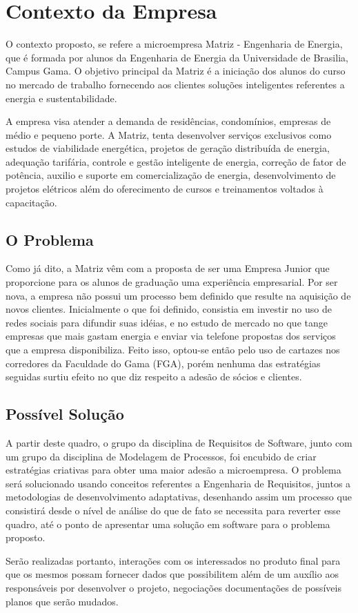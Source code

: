 \chapter[Contexto da Empresa]{Contexto da Empresa}
O contexto proposto, se refere a microempresa Matriz - Engenharia de Energia, que é formada por alunos da Engenharia de Energia da Universidade de Brasilia, Campus Gama. O objetivo principal da Matriz é a iniciação dos alunos do curso no mercado de trabalho fornecendo aos clientes soluções inteligentes referentes a energia e sustentabilidade.

A empresa visa atender a demanda de residências, condomínios, empresas de médio e pequeno porte. A Matriz, tenta desenvolver serviços exclusivos como estudos de viabilidade energética, projetos de geração distribuída de energia, adequação tarifária, controle e gestão inteligente de energia, correção de fator de potência, auxilio e suporte em comercialização de energia, desenvolvimento de projetos elétricos além do oferecimento de cursos e treinamentos voltados à capacitação.

\section{O Problema}
Como já dito, a Matriz vêm com a proposta de ser uma Empresa Junior que proporcione para os alunos de graduação uma experiência empresarial. Por ser nova, a empresa não possui um processo bem definido que resulte na aquisição de novos clientes. Inicialmente o que foi definido, consistia em investir no uso de redes sociais para difundir suas idéias, e no estudo de mercado no que tange empresas que mais gastam energia e enviar via telefone propostas dos serviços que a empresa disponibiliza. Feito isso, optou-se então pelo uso de cartazes nos corredores da Faculdade do Gama (FGA), porém nenhuma das estratégias seguidas surtiu efeito no que diz respeito a adesão de sócios e clientes.

\section{Possível Solução}
A partir deste quadro, o grupo da disciplina de Requisitos de Software, junto com um grupo da disciplina de Modelagem de Processos, foi encubido de criar estratégias criativas para obter uma maior adesão a microempresa. O problema será solucionado usando conceitos referentes a Engenharia de Requisitos, juntos a metodologias de desenvolvimento adaptativas, desenhando assim um processo que consistirá desde o nível de análise do que de fato se necessita para reverter esse quadro, até o ponto de apresentar uma solução em software para o problema proposto.

Serão realizadas portanto, interações com os interessados no produto final para que os mesmos possam fornecer dados que possibilitem além de um auxílio aos responsáveis por desenvolver o projeto, negociações documentações de possíveis planos que serão mudados.
